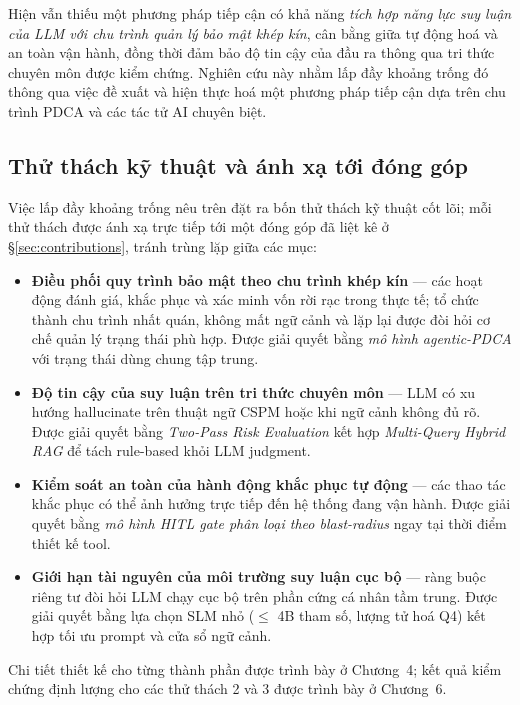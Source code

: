 Hiện vẫn thiếu một phương pháp tiếp cận có khả năng \textit{tích hợp năng lực suy luận của LLM với chu trình quản lý bảo mật khép kín}, cân bằng giữa tự động hoá và an toàn vận hành, đồng thời đảm bảo độ tin cậy của đầu ra thông qua tri thức chuyên môn được kiểm chứng. Nghiên cứu này nhằm lấp đầy khoảng trống đó thông qua việc đề xuất và hiện thực hoá một phương pháp tiếp cận dựa trên chu trình PDCA và các tác tử AI chuyên biệt.

\subsection*{Thử thách kỹ thuật và ánh xạ tới đóng góp}

Việc lấp đầy khoảng trống nêu trên đặt ra bốn thử thách kỹ thuật cốt lõi; mỗi thử thách được ánh xạ trực tiếp tới một đóng góp đã liệt kê ở §\ref{sec:contributions}, tránh trùng lặp giữa các mục:

\begin{itemize}
    \item \textbf{Điều phối quy trình bảo mật theo chu trình khép kín} --- các hoạt động đánh giá, khắc phục và xác minh vốn rời rạc trong thực tế; tổ chức thành chu trình nhất quán, không mất ngữ cảnh và lặp lại được đòi hỏi cơ chế quản lý trạng thái phù hợp. Được giải quyết bằng \textit{mô hình agentic-PDCA} với trạng thái dùng chung tập trung.

    \item \textbf{Độ tin cậy của suy luận trên tri thức chuyên môn} --- LLM có xu hướng hallucinate trên thuật ngữ CSPM hoặc khi ngữ cảnh không đủ rõ. Được giải quyết bằng \textit{Two-Pass Risk Evaluation} kết hợp \textit{Multi-Query Hybrid RAG} để tách rule-based khỏi LLM judgment.

    \item \textbf{Kiểm soát an toàn của hành động khắc phục tự động} --- các thao tác khắc phục có thể ảnh hưởng trực tiếp đến hệ thống đang vận hành. Được giải quyết bằng \textit{mô hình HITL gate phân loại theo blast-radius} ngay tại thời điểm thiết kế tool.

    \item \textbf{Giới hạn tài nguyên của môi trường suy luận cục bộ} --- ràng buộc riêng tư đòi hỏi LLM chạy cục bộ trên phần cứng cá nhân tầm trung. Được giải quyết bằng lựa chọn SLM nhỏ ($\le$ 4B tham số, lượng tử hoá Q4) kết hợp tối ưu prompt và cửa sổ ngữ cảnh.
\end{itemize}

Chi tiết thiết kế cho từng thành phần được trình bày ở Chương~4; kết quả kiểm chứng định lượng cho các thử thách 2 và 3 được trình bày ở Chương~6.


